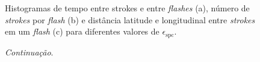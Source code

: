 \begin{anexosenv}
\begin{figure}[hb]
	\begin{center}
		\caption{Histogramas de tempo entre strokes e entre \textit{flashes} (a), número de \textit{strokes} por \textit{flash} (b) e distância latitude e longitudinal entre \textit{strokes} em um \textit{flash} (c) para diferentes valores de $\epsilon_{\text{spc}}$.} 
		\label{flash_stats_multi}
		 \\
		 \\
	\end{center}
\end{figure}
\clearpage
\begin{figure}[ht]\ContinuedFloat
	\begin{center}
		\caption{\textit{Continuação}.}
\end{center}
\end{figure}
\end{anexosenv}
